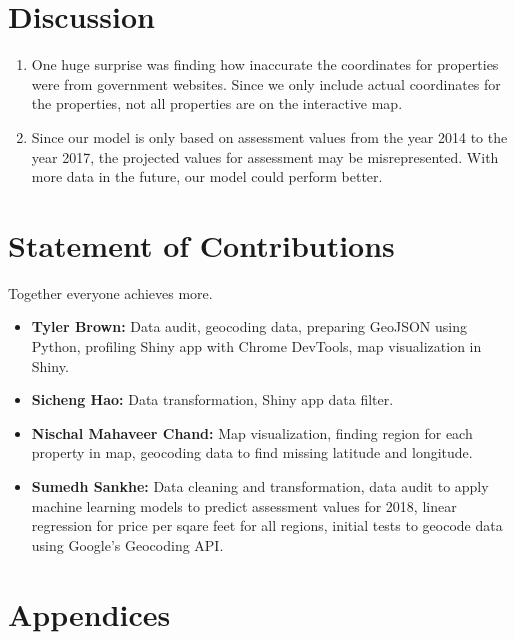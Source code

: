 \documentclass[12pt]{article}
\begin{document}
\section*{Discussion}

    \begin{enumerate}
        \item One huge surprise was finding how inaccurate the 
          coordinates for properties were from government websites. Since
          we only include actual coordinates for the properties, not all 
          properties are on the interactive map.

        \item Since our model is only based on assessment values from the
          year 2014 to the year 2017, the projected values for assessment
          may be misrepresented. With more data in the future, our model 
          could perform better.
    \end{enumerate}

\section*{Statement of Contributions}

Together everyone achieves more.

\begin{itemize}
\item \textbf{Tyler Brown:} Data audit, geocoding data, preparing GeoJSON
  using Python, profiling Shiny app with Chrome DevTools, map 
  visualization in Shiny.
\item \textbf{Sicheng Hao:} Data transformation, Shiny app data filter.
\item \textbf{Nischal Mahaveer Chand:} Map visualization, finding region
  for each property in map, geocoding data to find missing latitude and
  longitude.
\item \textbf{Sumedh Sankhe:} Data cleaning and transformation, data 
  audit to apply machine learning models to predict assessment values for
  2018, linear regression for price per sqare feet for all regions, 
  initial tests to geocode data using Google's Geocoding API.
\end{itemize}


 



\section*{Appendices}
\end{document}
